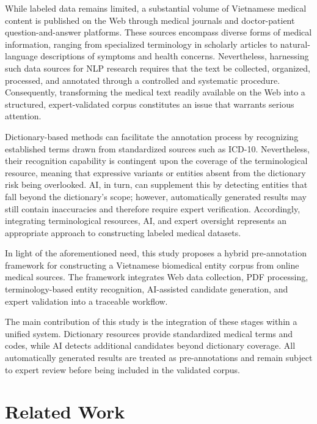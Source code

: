 \documentclass[runningheads]{llncs}
\begin{document}
While labeled data remains limited, a substantial volume of Vietnamese medical content is published on the Web through medical journals and doctor-patient question-and-answer platforms. These sources encompass diverse forms of medical information, ranging from specialized terminology in scholarly articles to natural-language descriptions of symptoms and health concerns. Nevertheless, harnessing such data sources for NLP research requires that the text be collected, organized, processed, and annotated through a controlled and systematic procedure. Consequently, transforming the medical text readily available on the Web into a structured, expert-validated corpus constitutes an issue that warrants serious attention.

Dictionary-based methods can facilitate the annotation process by recognizing established terms drawn from standardized sources such as ICD-10. Nevertheless, their recognition capability is contingent upon the coverage of the terminological resource, meaning that expressive variants or entities absent from the dictionary risk being overlooked. AI, in turn, can supplement this by detecting entities that fall beyond the dictionary's scope; however, automatically generated results may still contain inaccuracies and therefore require expert verification. Accordingly, integrating terminological resources, AI, and expert oversight represents an appropriate approach to constructing labeled medical datasets.

In light of the aforementioned need, this study proposes a hybrid pre-annotation framework for constructing a Vietnamese biomedical entity corpus from online medical sources. The framework integrates Web data collection, PDF processing, terminology-based entity recognition, AI-assisted candidate generation, and expert validation into a traceable workflow.

The main contribution of this study is the integration of these stages within a unified system. Dictionary resources provide standardized medical terms and codes, while AI detects additional candidates beyond dictionary coverage. All automatically generated results are treated as pre-annotations and remain subject to expert review before being included in the validated corpus.

\section{Related Work}
\end{document}
